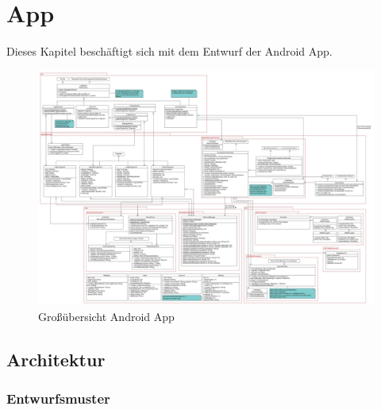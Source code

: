 \label{chap:app}\chapter{App}
Dieses Kapitel beschäftigt sich mit dem Entwurf der Android App. 

\begin{figure}[ht]
	\centering
\includegraphics[width=1\textwidth]{./resources/Diagramme/App/UMLAndroidApp.jpg}
\caption{Großübersicht Android App}
	\label{fig:UMLAndoidApp}
\end{figure}

\section{Architektur}
\subsection{Entwurfsmuster}